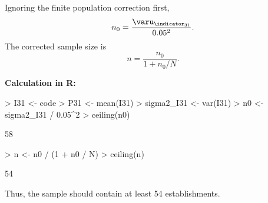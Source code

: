 \begin{Problem}
\begin{Subtask}
\begin{Solution}
        Ignoring the finite population correction first,
        \begin{equation*}
            n_0 = \frac{\varu_{\indicator_{31}}}{0.05^2}.
        \end{equation*}
        The corrected sample size is
        \begin{equation*}
            n = \frac{n_0}{1 + n_0/N}.
        \end{equation*}

        \textbf{Calculation in R:}

\begin{Schunk}
\begin{Sinput}
> I31 <- code
> P31 <- mean(I31)
> sigma2_I31 <- var(I31)
> n0 <- sigma2_I31 / 0.05^2
> ceiling(n0)
\end{Sinput}
\begin{Soutput}
[1] 58
\end{Soutput}
\end{Schunk}

\begin{Schunk}
\begin{Sinput}
> n <- n0 / (1 + n0 / N)
> ceiling(n)
\end{Sinput}
\begin{Soutput}
[1] 54
\end{Soutput}
\end{Schunk}

        Thus, the sample should contain at least 54
        establishments.
    \end{Solution}
\end{Subtask}
\end{Problem}
